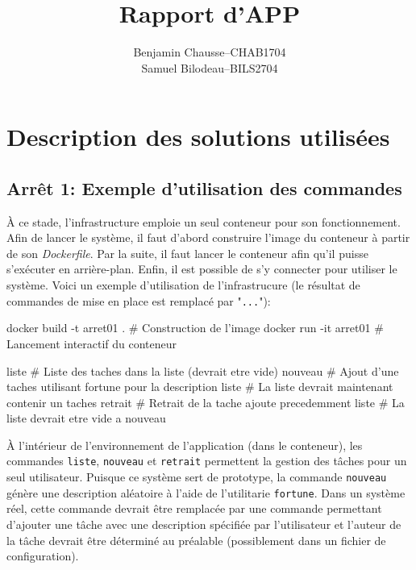\documentclass[a11paper, 11pt]{article}
\title{Rapport d'APP}
\author{
  \addtolength{\tabcolsep}{-0.4em}
  \begin{tabular}{rcl} %
  Benjamin Chausse & -- & CHAB1704 \\
  Samuel Bilodeau  & -- & BILS2704 \\
  \end{tabular}
}
\begin{document}
\maketitle
\newpage
\tableofcontents
\newpage

\section{Description des solutions utilisées}

\subsection{Arrêt 1: Exemple d'utilisation des commandes}

À ce stade, l'infrastructure emploie un seul conteneur pour son fonctionnement.
Afin de lancer le système, il faut d'abord construire l'image du conteneur à
partir de son \textit{Dockerfile}. Par la suite, il faut lancer le conteneur
afin qu'il puisse s'exécuter en arrière-plan. Enfin, il est possible de s'y
connecter pour utiliser le système. Voici un exemple d'utilisation de
l'infrastrucure (le résultat de commandes de mise en place est remplacé par
"\texttt{...}"):

\begin{code}[title={zsh (dans un terminal)},listing options={language=bash, style=bashstyle}]
docker build -t arret01 . # Construction de l'image
docker run -it arret01 # Lancement interactif du conteneur
\end{code}

\begin{code}[title={sh (dans le conteneur)},listing options={language=bash, style=bashstyle}]
liste   # Liste des taches dans la liste (devrait etre vide)
nouveau # Ajout d'une taches utilisant fortune pour la description
liste   # La liste devrait maintenant contenir un taches
retrait # Retrait de la tache ajoute precedemment
liste   # La liste devrait etre vide a nouveau
\end{code}

À l'intérieur de l'environnement de l'application (dans le conteneur), les
commandes \texttt{liste}, \texttt{nouveau} et \texttt{retrait} permettent la
gestion des tâches pour un seul utilisateur. Puisque ce système sert de
prototype, la commande \texttt{nouveau} génère une description aléatoire à
l'aide de l'utilitarie \texttt{fortune}. Dans un système réel, cette commande
devrait être remplacée par une commande permettant d'ajouter une tâche avec une
description spécifiée par l'utilisateur et l'auteur de la tâche devrait être
déterminé au préalable (possiblement dans un fichier de configuration).
\end{document}
